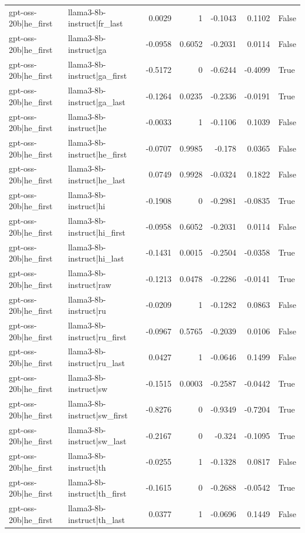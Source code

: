 \begin{table}
\begin{tabular}{l l r r r r l}
gpt-oss-20b|he_first & llama3-8b-instruct|fr_last & 0.0029 & 1 & -0.1043 & 0.1102 & False \\
gpt-oss-20b|he_first & llama3-8b-instruct|ga & -0.0958 & 0.6052 & -0.2031 & 0.0114 & False \\
gpt-oss-20b|he_first & llama3-8b-instruct|ga_first & -0.5172 & 0 & -0.6244 & -0.4099 & True \\
gpt-oss-20b|he_first & llama3-8b-instruct|ga_last & -0.1264 & 0.0235 & -0.2336 & -0.0191 & True \\
gpt-oss-20b|he_first & llama3-8b-instruct|he & -0.0033 & 1 & -0.1106 & 0.1039 & False \\
gpt-oss-20b|he_first & llama3-8b-instruct|he_first & -0.0707 & 0.9985 & -0.178 & 0.0365 & False \\
gpt-oss-20b|he_first & llama3-8b-instruct|he_last & 0.0749 & 0.9928 & -0.0324 & 0.1822 & False \\
gpt-oss-20b|he_first & llama3-8b-instruct|hi & -0.1908 & 0 & -0.2981 & -0.0835 & True \\
gpt-oss-20b|he_first & llama3-8b-instruct|hi_first & -0.0958 & 0.6052 & -0.2031 & 0.0114 & False \\
gpt-oss-20b|he_first & llama3-8b-instruct|hi_last & -0.1431 & 0.0015 & -0.2504 & -0.0358 & True \\
gpt-oss-20b|he_first & llama3-8b-instruct|raw & -0.1213 & 0.0478 & -0.2286 & -0.0141 & True \\
gpt-oss-20b|he_first & llama3-8b-instruct|ru & -0.0209 & 1 & -0.1282 & 0.0863 & False \\
gpt-oss-20b|he_first & llama3-8b-instruct|ru_first & -0.0967 & 0.5765 & -0.2039 & 0.0106 & False \\
gpt-oss-20b|he_first & llama3-8b-instruct|ru_last & 0.0427 & 1 & -0.0646 & 0.1499 & False \\
gpt-oss-20b|he_first & llama3-8b-instruct|sw & -0.1515 & 0.0003 & -0.2587 & -0.0442 & True \\
gpt-oss-20b|he_first & llama3-8b-instruct|sw_first & -0.8276 & 0 & -0.9349 & -0.7204 & True \\
gpt-oss-20b|he_first & llama3-8b-instruct|sw_last & -0.2167 & 0 & -0.324 & -0.1095 & True \\
gpt-oss-20b|he_first & llama3-8b-instruct|th & -0.0255 & 1 & -0.1328 & 0.0817 & False \\
gpt-oss-20b|he_first & llama3-8b-instruct|th_first & -0.1615 & 0 & -0.2688 & -0.0542 & True \\
gpt-oss-20b|he_first & llama3-8b-instruct|th_last & 0.0377 & 1 & -0.0696 & 0.1449 & False \\

\end{tabular}
\end{table}
